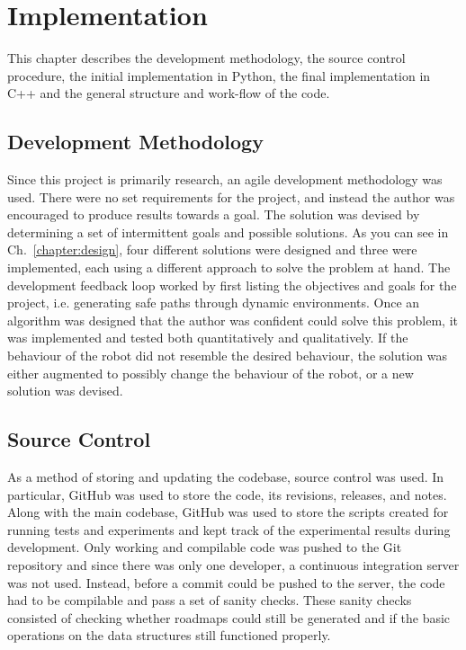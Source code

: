 


\chapter{Implementation}

\label{chapter:Implementation}

This chapter describes the development methodology, the source control
procedure, the initial implementation in Python, the final implementation in
C++ and the general structure and work-flow of the code.

\section{Development Methodology}

Since this project is primarily research, an agile development methodology was
used. There were no set requirements for the project, and instead the author
was encouraged to produce results towards a goal. The solution was devised by
determining a set of intermittent goals and possible solutions. As you can see
in Ch.~\ref{chapter:design}, four different solutions were designed and three
were implemented, each using a different approach to solve the problem at hand.
The development feedback loop worked by first listing the objectives and goals
for the project, i.e. generating safe paths through dynamic environments. Once
an algorithm was designed that the author was confident could solve this
problem, it was implemented and tested both quantitatively and qualitatively.
If the behaviour of the robot did not resemble the desired behaviour, the
solution was either augmented to possibly change the behaviour of the robot, or
a new solution was devised.

\section{Source Control}

As a method of storing and updating the codebase, source control was used. In
particular, GitHub was used to store the code, its revisions, releases, and
notes. Along with the main codebase, GitHub was used to store the scripts
created for running tests and experiments and kept track of the experimental
results during development. Only working and compilable code was pushed to the
Git repository and since there was only one developer, a continuous integration
server was not used. Instead, before a commit could be pushed to the server,
the code had to be compilable and pass a set of sanity checks. These sanity
checks consisted of checking whether roadmaps could still be generated and if
the basic operations on the data structures still functioned properly.

